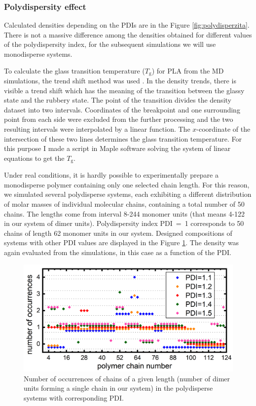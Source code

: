 \subsubsection{Polydispersity effect}
Calculated densities depending on the PDIs are in the Figure \ref{fig:polydisperzita}. There is not a massive difference among the densities obtained for different values of the polydispersity index, for the subsequent simulations we will use monodisperse systems. 

To calculate the glass transition temperature ($T_\mathrm{g}$) for PLA from the MD simulations, the trend shift method was used \cite{trend_shift}. In the density trends, there is visible a trend shift which has the meaning of the transition between the glassy state and the rubbery state. The point of the transition divides the density dataset into two intervals. Coordinates of the breakpoint and one surrounding point from each side were excluded from the further processing and the two resulting intervals were interpolated by a linear function. The $x$-coordinate of the intersection of these two lines determines the glass transition temperature. For this purpose I made a script in Maple software solving the system of linear equations to get the $T_\mathrm{g}$.

Under real conditions, it is hardly possible to experimentally prepare a monodisperse polymer containing only one selected chain length. For this reason, we simulated several polydisperse systems, each exhibiting a different distribution of molar masses of individual molecular chains, containing a total number of 50 chains. The lengths come from interval 8-244 monomer units (that means 4-122 in our system of dimer units). Polydispersity index PDI~=~1 corresponds to 50 chains of length 62 monomer units in our system. Designed compositions of systems with other PDI values are displayed in the Figure \ref{fig:polydisperzita_vyskyt}. The density was again evaluated from the simulations, in this case as a function of the PDI.
\begin{figure}[htb]
	\centering
	\includegraphics[width=1\hsize]{img/polydispersity_occurrences.png}
	\caption{Number of occurrences of chains of a given length (number of dimer units forming a single chain in our system) in the polydisperse systems with corresponding PDI.}
	\label{fig:polydisperzita_vyskyt}
\end{figure}       

